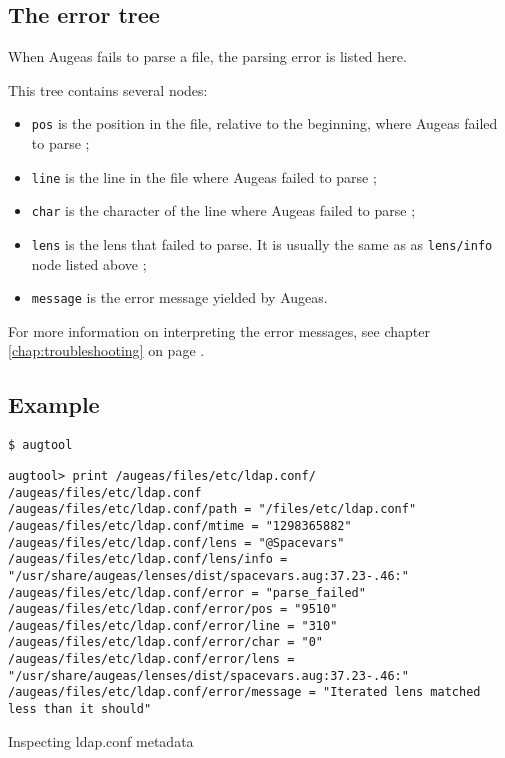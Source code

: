 \subsection{The error tree}

When Augeas fails to parse a file, the parsing error is listed here.

This tree contains several nodes:

\begin{itemize}
\item
  \verb!pos! is the position in the file, relative to the beginning, where Augeas failed to parse ;
\item
  \verb!line! is the line in the file where Augeas failed to parse ;
\item
  \verb!char! is the character of the line where Augeas failed to parse ;
\item
  \verb!lens! is the lens that failed to parse. It is usually the same as as \verb!lens/info! node listed above ;
\item
  \verb!message! is the error message yielded by Augeas.
\end{itemize}
For more information on interpreting the error messages, see chapter \ref{chap:troubleshooting} on page \pageref{chap:troubleshooting}.

\subsection{Example}

\begin{listing}
  \begin{verbatim}
$ augtool 
  \end{verbatim}
  \begin{verbatim}
augtool> print /augeas/files/etc/ldap.conf/
/augeas/files/etc/ldap.conf
/augeas/files/etc/ldap.conf/path = "/files/etc/ldap.conf"
/augeas/files/etc/ldap.conf/mtime = "1298365882"
/augeas/files/etc/ldap.conf/lens = "@Spacevars"
/augeas/files/etc/ldap.conf/lens/info = "/usr/share/augeas/lenses/dist/spacevars.aug:37.23-.46:"
/augeas/files/etc/ldap.conf/error = "parse_failed"
/augeas/files/etc/ldap.conf/error/pos = "9510"
/augeas/files/etc/ldap.conf/error/line = "310"
/augeas/files/etc/ldap.conf/error/char = "0"
/augeas/files/etc/ldap.conf/error/lens = "/usr/share/augeas/lenses/dist/spacevars.aug:37.23-.46:"
/augeas/files/etc/ldap.conf/error/message = "Iterated lens matched less than it should"
  \end{verbatim}
  \caption{Inspecting ldap.conf metadata}
  \label{lst:metadata_ldap_conf}
\end{listing}

